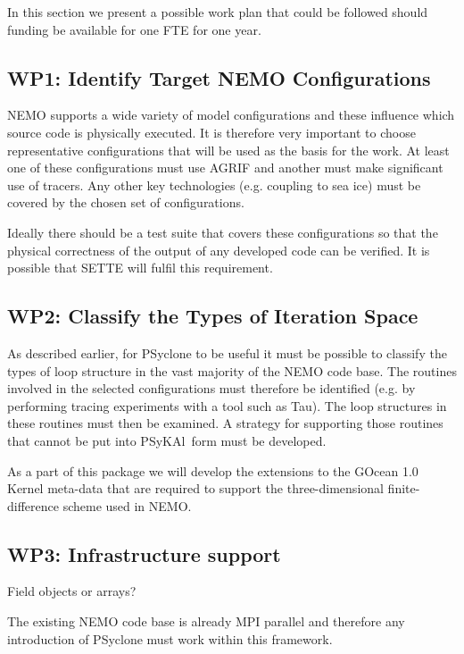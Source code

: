 \documentclass{article}
\newcommand{\psykal}{{PS}y{KA}l}
\begin{document}
In this section we present a possible work plan that could be followed
should funding be available for one FTE for one year.

\subsection{WP1: Identify Target NEMO Configurations}
\label{wp1_target_configs}

NEMO supports a wide variety of model configurations and these
influence which source code is physically executed. It is therefore
very important to choose representative configurations that will be
used as the basis for the work. At least one of these configurations
must use AGRIF and another must make significant use of tracers.  Any
other key technologies (e.g. coupling to sea ice) must be covered by
the chosen set of configurations.

Ideally there should be a test suite that covers these configurations
so that the physical correctness of the output of any developed code
can be verified. It is possible that SETTE will fulfil this
requirement.

\subsection{WP2: Classify the Types of Iteration Space}
\label{wp2_classify}

As described earlier, for PSyclone to be useful it must be possible to
classify the types of loop structure in the vast majority of the NEMO
code base. The routines involved in the selected configurations must
therefore be identified (e.g. by performing tracing experiments with a
tool such as Tau). The loop structures in these routines must then be
examined. A strategy for supporting those routines that cannot be put
into \psykal\ form must be developed.

As a part of this package we will develop the extensions to the GOcean
1.0 Kernel meta-data that are required to support the
three-dimensional finite-difference scheme used in NEMO.

\subsection{WP3: Infrastructure support}
\label{wp3_infrastructure}

Field objects or arrays?

The existing NEMO code base is already MPI parallel and therefore any
introduction of PSyclone must work within this framework.
\end{document}
